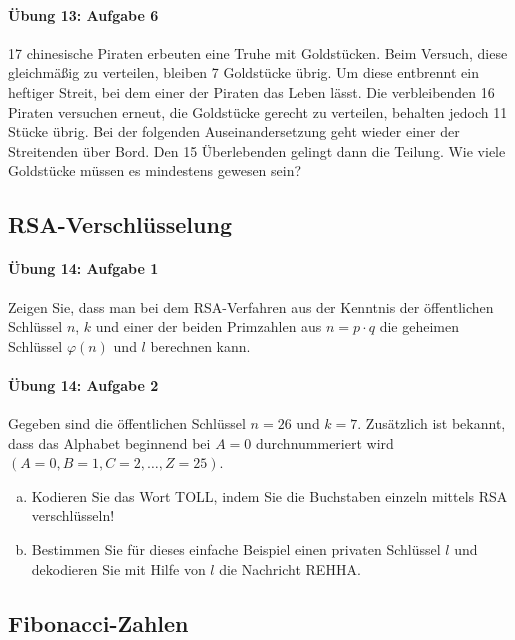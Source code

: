 \documentclass
[
  draft    = true,
  fontsize = 11pt,
  parskip  = half-,
  BCOR     = 0pt,
  DIV      = 11,
  ngerman,
  dvipsnames
]
{scrartcl}
\begin{document}
\paragraph{Übung 13: Aufgabe 6}
17 chinesische Piraten erbeuten eine Truhe mit Goldstücken. Beim Versuch,
diese gleichmäßig zu verteilen, bleiben 7 Goldstücke übrig. Um diese
entbrennt ein heftiger Streit, bei dem einer der Piraten das Leben lässt.
Die verbleibenden 16 Piraten versuchen erneut, die Goldstücke gerecht
zu verteilen, behalten jedoch 11 Stücke übrig. Bei der folgenden
Auseinandersetzung geht wieder einer der Streitenden über Bord. Den 15
Überlebenden gelingt dann die Teilung. Wie viele Goldstücke müssen es
mindestens gewesen sein?

\subsection{RSA-Verschlüsselung}

\paragraph{Übung 14: Aufgabe 1}
Zeigen Sie, dass man bei dem RSA-Verfahren aus der Kenntnis der öffentlichen
Schlüssel $n$, $k$ und einer der beiden Primzahlen aus $n=p\cdot q$ die
geheimen Schlüssel $\varphi(n)$ und $l$ berechnen kann.

\paragraph{Übung 14: Aufgabe 2}
Gegeben sind die öffentlichen Schlüssel $n=26$ und $k=7$. Zusätzlich
ist bekannt, dass das Alphabet beginnend bei $A=0$ durchnummeriert
wird $(A=0,B=1,C=2,\ldots,Z=25)$.
\begin{enumerate}[a)]
  \item Kodieren Sie das Wort \glqq{}TOLL\grqq, indem Sie die Buchstaben
        einzeln mittels RSA verschlüsseln!
  \item Bestimmen Sie für dieses einfache Beispiel einen privaten Schlüssel
        $l$ und dekodieren Sie mit Hilfe von $l$ die Nachricht \glqq{}REHHA\grqq.
\end{enumerate}

\subsection{Fibonacci-Zahlen}
\end{document}
